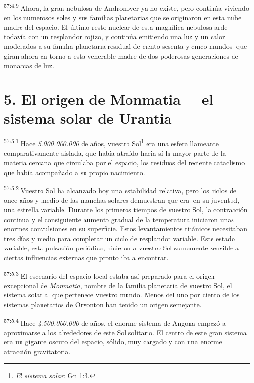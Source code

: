 \par
\textsuperscript{57:4.9} Ahora, la gran nebulosa de Andronover ya no existe, pero continúa viviendo en los numerosos soles y sus familias planetarias que se originaron en esta nube madre del espacio. El último resto nuclear de esta magnífica nebulosa arde todavía con un resplandor rojizo, y continúa emitiendo una luz y un calor moderados a su familia planetaria residual de ciento sesenta y cinco mundos, que giran ahora en torno a esta venerable madre de dos poderosas generaciones de monarcas de luz.

\section*{5. El origen de Monmatia ---el sistema solar de Urantia}
\par
\textsuperscript{57:5.1} Hace \textit{5.000.000.000} de años, vuestro Sol\footnote{\textit{El sistema solar}: Gn 1:3.} era una esfera llameante comparativamente aislada, que había atraído hacia sí la mayor parte de la materia cercana que circulaba por el espacio, los residuos del reciente cataclismo que había acompañado a su propio nacimiento.

\par
\textsuperscript{57:5.2} Vuestro Sol ha alcanzado hoy una estabilidad relativa, pero los ciclos de once años y medio de las manchas solares demuestran que era, en su juventud, una estrella variable. Durante los primeros tiempos de vuestro Sol, la contracción continua y el consiguiente aumento gradual de la temperatura iniciaron unas enormes convulsiones en su superficie. Estos levantamientos titánicos necesitaban tres días y medio para completar un ciclo de resplandor variable. Este estado variable, esta pulsación periódica, hicieron a vuestro Sol sumamente sensible a ciertas influencias externas que pronto iba a encontrar.

\par
\textsuperscript{57:5.3} El escenario del espacio local estaba así preparado para el origen excepcional de \textit{Monmatia}, nombre de la familia planetaria de vuestro Sol, el sistema solar al que pertenece vuestro mundo. Menos del uno por ciento de los sistemas planetarios de Orvonton han tenido un origen semejante.

\par
\textsuperscript{57:5.4} Hace \textit{4.500.000.000} de años, el enorme sistema de Angona empezó a aproximarse a los alrededores de este Sol solitario. El centro de este gran sistema era un gigante oscuro del espacio, sólido, muy cargado y con una enorme atracción gravitatoria.

